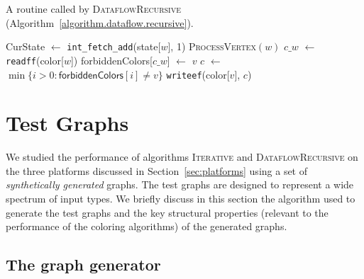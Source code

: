 \documentclass{article}
\begin{document}
\begin{algorithm}[t]
\small
\caption{A routine called by \textsc{DataflowRecursive} (Algorithm~\ref{algorithm.dataflow.recursive}).}
\label{algorithm.process.vertex}
\begin{algorithmic}[1]
             \State CurState $\gets$ \texttt{int\_fetch\_add}(\textsf{state}[$w$], 1)
                \State \textsc{ProcessVertex}$(w)$ 
             \EndIf
             \State $c\_w$ $\leftarrow$ \texttt{readff}(\textsf{color}[$w$])
                  \label{processvertex-readff-line} 
          \State \textsf{forbiddenColors}[$c\_w$] $\leftarrow$ $v$ 
   \EndFor
   \State $c$  $\leftarrow$ $\min\{i>0: \textsf{forbiddenColors}[i] \neq v\}$  
   \State \texttt{writeef}(\textsf{color}[$v$], $c$) 
\EndProcedure
\end{algorithmic}
\end{algorithm}


\section{Test Graphs}
\label{sec:graphs}

We studied the performance of algorithms \textsc{Iterative} and \textsc{DataflowRecursive}
on the three platforms discussed in Section~\ref{sec:platforms}
using a set of {\em synthetically generated} graphs.
The test graphs are designed to  represent a wide spectrum of input types. 
We briefly discuss in this section the algorithm used to 
generate the test graphs and the key structural properties 
(relevant to the performance of the coloring algorithms) 
of the generated graphs.

\subsection{The graph generator}
\end{document}
